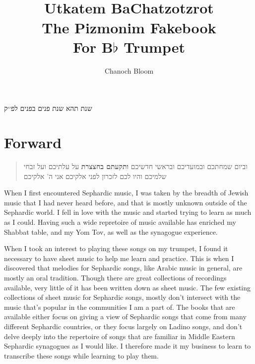 \documentclass[letterpaper]{memoir}
\title{\RL{ותקעתם בחצוצרות} \\
Utkatem BaChatzotzrot \\
The Pizmonim Fakebook \\
For B$\flat$ Trumpet
}
\author{Chanoch Bloom}
\begin{document}
\begin{titlingpage}
\maketitle
   \begin{RTL}
      \begin{center}
	 שנת
	 {\Large ת}הא
	 {\Large ש}נת
	 {\Large פ}נים
	 {\Large ב}פנים
	 לפ׳׳ק
      \end{center}
   \end{RTL}
\end{titlingpage}

\setlength{\footskip}{72pt}
\pagestyle{plain}
\tableofcontents*

\chapter{Forward}

\begin{RTL}
\begin{quotation}
\begin{center}
וביום שמחתכם ובמועדיכם ובראשי חדשיכם
\textbf{ותקעתם בחצצרת} 
על עלתיכם ועל זבחי שלמיכם והיו לכם לזכרון לפני אלקיכם אני ה' אלקיכם
\end{center}
\end{quotation}
\end{RTL}

When I first encountered Sephardic music, I was taken by the breadth of Jewish 
music that I had never heard before, and that is mostly unknown outside of the 
Sephardic world. I fell in love with the music and started trying to learn as 
much as I could. Having such a wide repretoire of music available has enriched 
my Shabbat table, and my Yom Tov, as well as the synagogue experience.

When I took an interest to playing these songs on my trumpet, I found it 
necessary to have sheet music to help me learn and practice. This is when I 
discovered that melodies for Sephardic songs, like Arabic music in general, are 
mostly an oral tradition. Though there are great collections of recordings available,
very little of it has been written down as sheet music.
The few existing collections of sheet music for 
Sephardic songs, mostly don't intersect with the music that's popular in the 
communities I am a part of. The books that are available either focus on giving 
a view of Sephardic songs that come from many different Sephardic countries, or 
they focus largely on Ladino songs, and don't delve deeply into the repertoire 
of songs that are familiar in Middle Eastern Sephardic synagogues as I would 
like. I therefore made it my business to learn to transcribe these songs while 
learning to play them.
\end{document}
